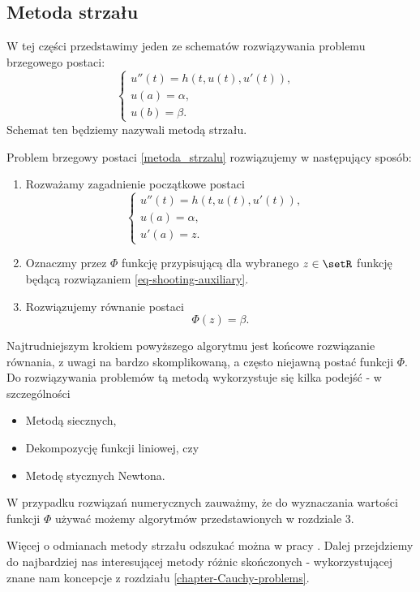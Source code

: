 \subsection{Metoda strzału}
W tej części przedstawimy jeden ze schematów rozwiązywania problemu brzegowego postaci:
\begin{equation}\label{metoda_strzalu}
\left\{\begin{array}{ll}
u''(t)=h(t,u(t),u'(t)), & \\
u(a)= \alpha, & \\
u(b)= \beta.
\end{array}\right.
\end{equation}
Schemat ten będziemy nazywali metodą strzału. 
\begin{algorithm}
Problem brzegowy postaci \eqref{metoda_strzalu} rozwiązujemy w następujący sposób:
\begin{enumerate}
\item Rozważamy zagadnienie początkowe postaci
\begin{equation} \label{eq-shooting-auxiliary}
\left\{\begin{array}{ll}
u''(t)=h(t,u(t),u'(t)), & \\
u(a)= \alpha, & \\
u'(a)= z.
\end{array}\right.
\end{equation}
\item Oznaczmy przez $\Phi$ funkcję przypisującą dla wybranego $z \in \setR$ funkcję będącą rozwiązaniem \eqref{eq-shooting-auxiliary}.
\item Rozwiązujemy równanie postaci 
$$
\Phi(z) = \beta.
$$ 
\end{enumerate}
Najtrudniejszym krokiem powyższego algorytmu jest końcowe rozwiązanie równania, z uwagi na bardzo skomplikowaną, a często niejawną postać funkcji $\Phi$. Do rozwiązywania problemów tą metodą wykorzystuje się kilka podejść - w szczególności
\begin{itemize}
\item Metodą siecznych,
\item Dekompozycję funkcji liniowej, czy
\item Metodę stycznych Newtona.
\end{itemize}
\end{algorithm}
W przypadku rozwiązań numerycznych zauważmy, że do wyznaczania wartości funkcji $\Phi$ używać możemy algorytmów przedstawionych w rozdziale 3.

Więcej o odmianach metody strzału odszukać można w pracy \citep{kincaid1991numerical}. Dalej przejdziemy do najbardziej nas interesującej metody różnic skończonych - wykorzystującej znane nam koncepcje z rozdziału \ref{chapter-Cauchy-problems}.
